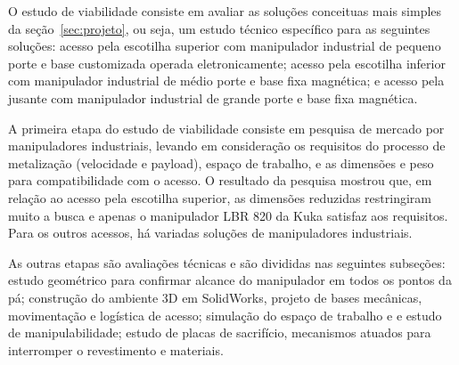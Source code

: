 O estudo de viabilidade consiste em avaliar as soluções conceituas mais simples 
da seção~\ref{sec:projeto}, ou seja, um estudo técnico específico para as
seguintes soluções: acesso pela escotilha superior com manipulador industrial de
pequeno porte e base customizada operada eletronicamente; acesso pela escotilha
inferior com manipulador industrial de médio porte e base fixa magnética; e
acesso pela jusante com manipulador industrial de grande porte e base fixa
magnética.

A primeira etapa do estudo de viabilidade consiste em pesquisa de mercado por
manipuladores industriais, levando em consideração os requisitos do processo de
metalização (velocidade e payload), espaço de trabalho, e as dimensões e peso
para compatibilidade com o acesso. O resultado da pesquisa mostrou que, em
relação ao acesso pela escotilha superior, as dimensões reduzidas restringiram muito a busca e apenas o
manipulador LBR 820 da Kuka satisfaz aos requisitos. Para os outros acessos, há
variadas soluções de manipuladores industriais.

As outras etapas são avaliações técnicas e são divididas nas seguintes
subseções: estudo geométrico para confirmar alcance do manipulador em todos os
pontos da pá; construção do ambiente 3D em SolidWorks, projeto de bases
mecânicas, movimentação e logística de acesso; simulação do espaço de trabalho e
e estudo de manipulabilidade; estudo de placas de sacrifício, mecanismos atuados
para interromper o revestimento e materiais. 
